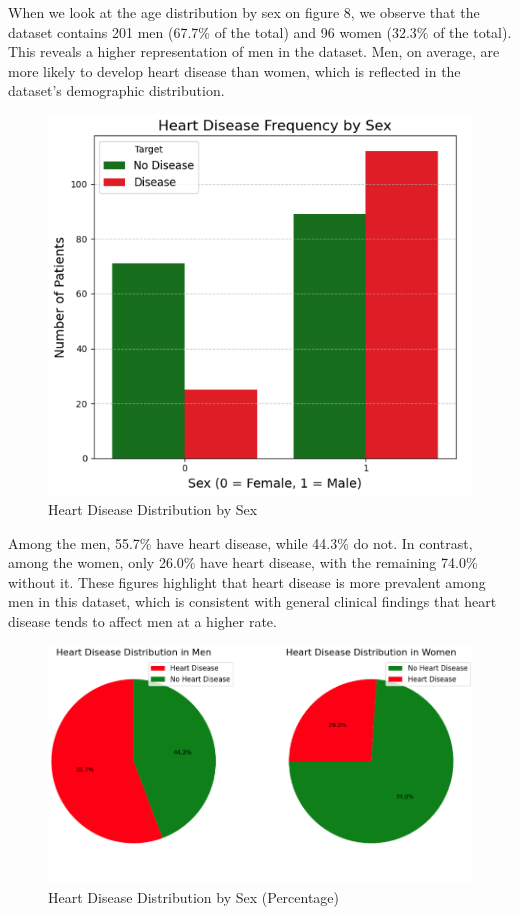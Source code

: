 When we look at the age distribution by sex on figure 8, we observe that the dataset contains 201 men (67.7\% of the total) and 96 women (32.3\% of the total). This reveals a higher representation of men in the dataset. Men, on average, are more likely to develop heart disease than women, which is reflected in the dataset's demographic distribution.

\begin{figure}[ht]
    \centering
    \includegraphics[width=0.75\linewidth]{images/freq_heart_disease_by_sex.png}
    \caption{Heart Disease Distribution by Sex }
    \label{fig:enter-label}
\end{figure}

Among the men, 55.7\% have heart disease, while 44.3\% do not. In contrast, among the women, only 26.0\% have heart disease, with the remaining 74.0\% without it. These figures highlight that heart disease is more prevalent among men in this dataset, which is consistent with general clinical findings that heart disease tends to affect men at a higher rate.
\begin{figure}[H]
    \centering
    \includegraphics[width=1\linewidth]{images/perc_disease_by_sex.png}
    \caption{Heart Disease Distribution by Sex (Percentage)}
    \label{fig:enter-label}
\end{figure}

